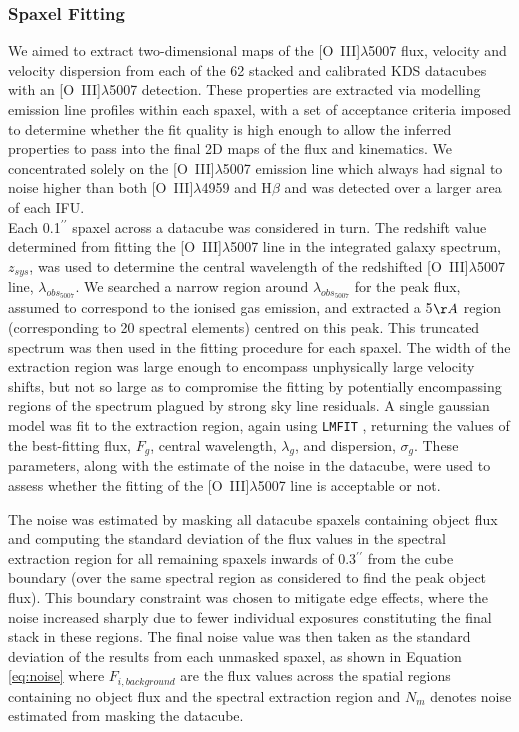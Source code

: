\documentclass[fleqn,usenatbib]{mnras}
\begin{document}
\subsubsection{Spaxel Fitting}\label{subsubsection:spaxel_fitting}
We aimed to extract two-dimensional maps of the [O~{\sc III}]$\lambda$5007 flux, velocity and velocity dispersion from each of the 62 stacked and calibrated KDS datacubes with an [O~{\sc III}]$\lambda$5007 detection.
These properties are extracted via modelling emission line profiles within each spaxel, with a set of acceptance criteria imposed to determine whether the fit quality is high enough to allow the inferred properties to pass into the final 2D maps of the flux and kinematics.
We concentrated solely on the [O~{\sc III}]$\lambda$5007 emission line which always had signal to noise higher than both [O~{\sc III}]$\lambda$4959 and H$\beta$ and was detected over a larger area of each IFU. \\

\noindent
Each 0.1$^{\prime\prime}$ spaxel across a datacube was considered in turn.
The redshift value determined from fitting the [O~{\sc III}]$\lambda$5007 line in the integrated galaxy spectrum, $z_{sys}$, was used to determine the central wavelength of the redshifted [O~{\sc III}]$\lambda$5007 line, $\lambda_{obs_{5007}}$. 
We searched a narrow region around $\lambda_{obs_{5007}}$ for the peak flux, assumed to correspond to the ionised gas emission, and extracted a 5$\AA$ region (corresponding to 20 spectral elements) centred on this peak.
This truncated spectrum was then used in the fitting procedure for each spaxel.
The width of the extraction region was large enough to encompass unphysically large velocity shifts, but not so large as to compromise the fitting by potentially encompassing regions of the spectrum plagued by strong sky line residuals.
A single gaussian model was fit to the extraction region, again using {\tt LMFIT} \citep{Newville2014}, returning the values of the best-fitting flux, $F_{g}$, central wavelength, $\lambda_{g}$, and dispersion, $\sigma_{g}$.
These parameters, along with the estimate of the noise in the datacube, were used to assess whether the fitting of the [O~{\sc III}]$\lambda$5007 line is acceptable or not. 

The noise was estimated by masking all datacube spaxels containing object flux and computing the standard deviation of the flux values in the spectral extraction region for all remaining spaxels inwards of 0.3$^{\prime\prime}$ from the cube boundary (over the same spectral region as considered to find the peak object flux).
This boundary constraint was chosen to mitigate edge effects, where the noise increased sharply due to fewer individual exposures constituting the final stack in these regions.
The final noise value was then taken as the standard deviation of the results from each unmasked spaxel, as shown in Equation \ref{eq:noise} where $F_{i,background}$ are the flux values across the spatial regions containing no object flux and the spectral extraction region and $N_{m}$ denotes noise estimated from masking the datacube.
\end{document}
